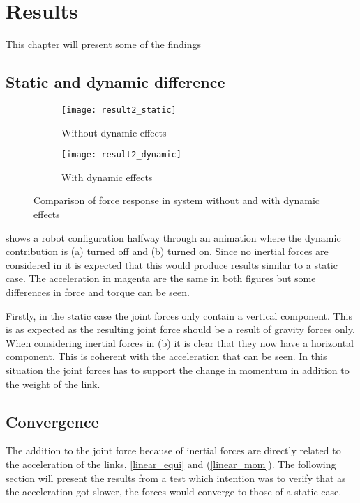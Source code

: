 \chapter{Results}

This chapter will present some of the findings 


\section{Static and dynamic difference}

\begin{figure}[h!]
\begin{subfigure}[b]{0.5\textwidth}
    \centering
    \texttt{[image: result2\_static]}
    \caption{Without dynamic effects}
    \label{result_static}
\end{subfigure}
\hfill
\begin{subfigure}[b]{0.5\textwidth}
    \centering
    \texttt{[image: result2\_dynamic]}
    \caption{With dynamic effects}
\end{subfigure}
\caption{Comparison of force response in system without and with dynamic effects}
\label{result_img}
\end{figure}

 shows a robot configuration halfway through an animation where the dynamic contribution is (a) turned off and (b) turned on. Since no inertial forces are considered in  it is expected that this would produce results similar to a static case. The acceleration in magenta are the same in both figures but some differences in force and torque can be seen.

Firstly, in the static case the joint forces only contain a vertical component. This is as expected as the resulting joint force should be a result of gravity forces only. When considering inertial forces in (b) it is clear that they now have a horizontal component. This is coherent with the acceleration that can be seen. In this situation the joint forces has to support the change in momentum in addition to the weight of the link.

\section{Convergence}


The addition to the joint force because of inertial forces are directly related to the acceleration of the links,  \eqref{linear_equi} and (\ref{linear_mom}). The following section will present the results from a test which intention was to verify that as the acceleration got slower, the forces would converge to those of a static case.